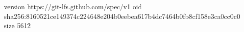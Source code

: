 version https://git-lfs.github.com/spec/v1
oid sha256:8160521ce149374c224648e204b0eebea617b4dc7464b0fb8cf158e3ca0cc0c0
size 5612
